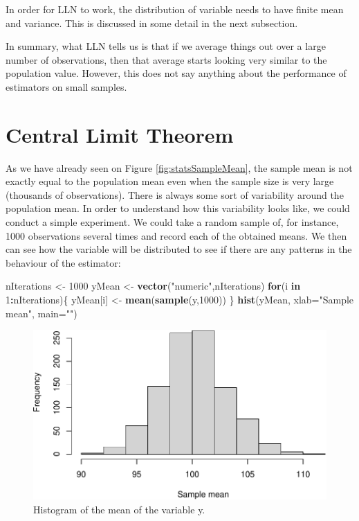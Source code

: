\documentclass[
]{book}
\newenvironment{Shaded}{\begin{snugshade}}{\end{snugshade}}
\newcommand{\AttributeTok}[1]{\textcolor[rgb]{0.13,0.29,0.53}{#1}}
\newcommand{\ControlFlowTok}[1]{\textcolor[rgb]{0.13,0.29,0.53}{\textbf{#1}}}
\newcommand{\DecValTok}[1]{\textcolor[rgb]{0.00,0.00,0.81}{#1}}
\newcommand{\FunctionTok}[1]{\textcolor[rgb]{0.13,0.29,0.53}{\textbf{#1}}}
\newcommand{\NormalTok}[1]{#1}
\newcommand{\OtherTok}[1]{\textcolor[rgb]{0.56,0.35,0.01}{#1}}
\newcommand{\SpecialCharTok}[1]{\textcolor[rgb]{0.81,0.36,0.00}{\textbf{#1}}}
\newcommand{\StringTok}[1]{\textcolor[rgb]{0.31,0.60,0.02}{#1}}
\theoremstyle{definition}
\theoremstyle{definition}
\theoremstyle{definition}
\theoremstyle{definition}
\theoremstyle{remark}
\begin{document}
In order for LLN to work, the distribution of variable needs to have finite mean and variance. This is discussed in some detail in the next subsection.

In summary, what LLN tells us is that if we average things out over a large number of observations, then that average starts looking very similar to the population value. However, this does not say anything about the performance of estimators on small samples.

\section{Central Limit Theorem}\label{CLT}

As we have already seen on Figure \ref{fig:statsSampleMean}, the sample mean is not exactly equal to the population mean even when the sample size is very large (thousands of observations). There is always some sort of variability around the population mean. In order to understand how this variability looks like, we could conduct a simple experiment. We could take a random sample of, for instance, 1000 observations several times and record each of the obtained means. We then can see how the variable will be distributed to see if there are any patterns in the behaviour of the estimator:

\begin{Shaded}
\begin{Highlighting}[]
\NormalTok{nIterations }\OtherTok{\textless{}{-}} \DecValTok{1000}
\NormalTok{yMean }\OtherTok{\textless{}{-}} \FunctionTok{vector}\NormalTok{(}\StringTok{"numeric"}\NormalTok{,nIterations)}
\ControlFlowTok{for}\NormalTok{(i }\ControlFlowTok{in} \DecValTok{1}\SpecialCharTok{:}\NormalTok{nIterations)\{}
\NormalTok{    yMean[i] }\OtherTok{\textless{}{-}} \FunctionTok{mean}\NormalTok{(}\FunctionTok{sample}\NormalTok{(y,}\DecValTok{1000}\NormalTok{))}
\NormalTok{\}}
\FunctionTok{hist}\NormalTok{(yMean, }\AttributeTok{xlab=}\StringTok{"Sample mean"}\NormalTok{, }\AttributeTok{main=}\StringTok{""}\NormalTok{)}
\end{Highlighting}
\end{Shaded}

\begin{figure}
\centering
\includegraphics{Svetunkov---Statistics-for-Business-Analytics_files/figure-latex/histyMean-1.pdf}
\caption{\label{fig:histyMean}Histogram of the mean of the variable y.}
\end{figure}
\end{document}
